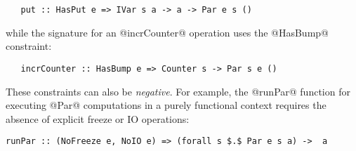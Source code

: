 \begin{lstlisting}
   put :: HasPut e => IVar s a -> a -> Par e s ()
\end{lstlisting}
while the signature for an @incrCounter@ operation uses the
@HasBump@ constraint:
\begin{lstlisting}
   incrCounter :: HasBump e => Counter s -> Par s e ()
\end{lstlisting}
These constraints can also be \emph{negative}.  For example, the
@runPar@ function for executing @Par@ computations in a purely
functional context requires the absence of explicit freeze or IO
operations:
\begin{lstlisting}[mathescape=true]
runPar :: (NoFreeze e, NoIO e) => (forall s $.$ Par e s a) ->  a 
\end{lstlisting}
